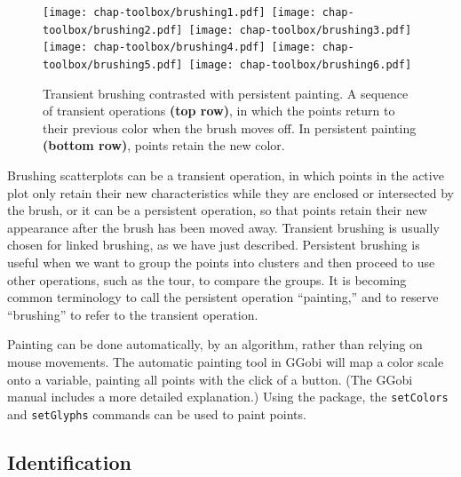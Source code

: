 \begin{figure}[htp]
\hbox{\texttt{[image: chap-toolbox/brushing1.pdf]}
      \texttt{[image: chap-toolbox/brushing2.pdf]}
      \texttt{[image: chap-toolbox/brushing3.pdf]}}
\smallskip
\hbox{\texttt{[image: chap-toolbox/brushing4.pdf]}
      \texttt{[image: chap-toolbox/brushing5.pdf]}
      \texttt{[image: chap-toolbox/brushing6.pdf]}}
\caption[Transient brushing contrasted with persistent
painting]{Transient brushing contrasted with persistent painting.
A sequence of transient operations {\bf (top row)}, in which the
points return to their previous color when the brush moves off.  
In persistent painting {\bf (bottom row)}, points retain the new
color.  }
\label{brushing}
\end{figure}


Brushing scatterplots can be a transient operation, in which points in
the active plot only retain their new characteristics while they are
enclosed or intersected by the brush, or it can be a persistent
operation, so that points retain their new appearance after the brush
has been moved away.  Transient brushing is usually chosen for linked
brushing, as we have just described.  Persistent brushing is useful
when we want to group the points into clusters and then proceed to use
other operations, such as the tour, to compare the groups. It is
becoming common terminology to call the persistent operation
``painting,'' and to reserve ``brushing'' to refer to the transient
operation.

Painting can be done automatically, by an algorithm, rather than
relying on mouse movements.  The automatic painting tool in GGobi will
map a color scale onto a variable, painting all points with the
click of a button.  (The GGobi manual includes a more detailed
explanation.)  Using the  package, the
\verb,setColors, and \verb,setGlyphs, commands can be used to paint
points.


\subsection{Identification}

